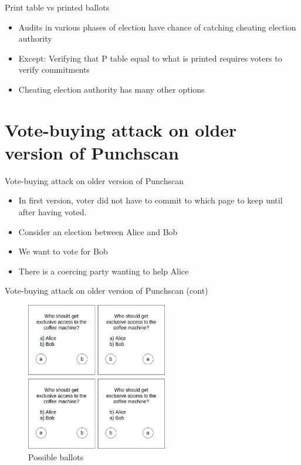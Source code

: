 \documentclass{beamer}
\begin{document}
\begin{frame}{Print table vs printed ballots}
	\begin{itemize}
		\item Audits in various phases of election have chance of
			catching cheating election authority
		\item Except: Verifying that P table equal to what is printed
			requires voters to verify commitments
		\item Cheating election authority has many other
			options\autocite{lundinTearDestroyChain2012}
	\end{itemize}
\end{frame}

\section{Vote-buying attack on older version of Punchscan \autocite{moranSplitballotVotingEverlasting2010}}

\begin{frame}{Vote-buying attack on older version of Punchscan}
	\begin{itemize}
		\item In first version, voter did not have to commit to which
			page to keep until after having voted.
		\item Consider an election between Alice and Bob
		\item We want to vote for Bob
		\item There is a coercing party wanting to help Alice
	\end{itemize}
\end{frame}

\begin{frame}{Vote-buying attack on older version of Punchscan (cont)}
	\begin{figure}
		\centering
		\includegraphics[width=0.55\textwidth]{../resources/vote_buying.drawio.png}
		\caption{Possible ballots}
	\end{figure}
\end{frame}
\end{document}
